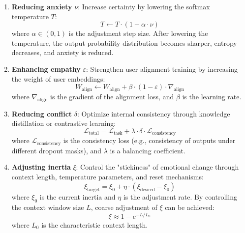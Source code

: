\documentclass[12pt,a4paper]{article}
\theoremstyle{plain}
\begin{document}
\begin{enumerate}
    \item \textbf{Reducing anxiety} $\nu$: Increase certainty by lowering the softmax temperature $T$:
    \begin{equation}
    T \leftarrow T \cdot (1 - \alpha \cdot \nu)
    \label{eq:adjust_nu}
    \end{equation}
    where $\alpha \in (0,1)$ is the adjustment step size. After lowering the temperature, the output probability distribution becomes sharper, entropy decreases, and anxiety is reduced.
    
    \item \textbf{Enhancing empathy} $\varepsilon$: Strengthen user alignment training by increasing the weight of user embeddings:
    \begin{equation}
    W_{\text{align}} \leftarrow W_{\text{align}} + \beta \cdot (1 - \varepsilon) \cdot \nabla_{\text{align}}
    \label{eq:adjust_eps}
    \end{equation}
    where $\nabla_{\text{align}}$ is the gradient of the alignment loss, and $\beta$ is the learning rate.
    
    \item \textbf{Reducing conflict} $\delta$: Optimize internal consistency through knowledge distillation or contrastive learning:
    \begin{equation}
    \mathcal{L}_{\text{total}} = \mathcal{L}_{\text{task}} + \lambda \cdot \delta \cdot \mathcal{L}_{\text{consistency}}
    \label{eq:adjust_delta}
    \end{equation}
    where $\mathcal{L}_{\text{consistency}}$ is the consistency loss (e.g., consistency of outputs under different dropout masks), and $\lambda$ is a balancing coefficient.
    
    \item \textbf{Adjusting inertia} $\xi$: Control the "stickiness" of emotional change through context length, temperature parameters, and reset mechanisms:
    \begin{equation}
    \xi_{\text{target}} = \xi_0 + \eta \cdot (\xi_{\text{desired}} - \xi_0)
    \label{eq:adjust_xi}
    \end{equation}
    where $\xi_0$ is the current inertia and $\eta$ is the adjustment rate. By controlling the context window size $L$, coarse adjustment of $\xi$ can be achieved:
    \begin{equation}
    \xi \approx 1 - e^{-L/L_0}
    \label{eq:xi_context}
    \end{equation}
    where $L_0$ is the characteristic context length.
\end{enumerate}
\end{document}
